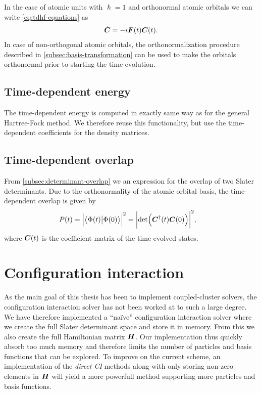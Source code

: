             In the case of atomic units with $\hslash = 1$ and orthonormal
            atomic orbitals we can write \autoref{eq:tdhf-equations} as
            \begin{align}
                \dot{\boldsymbol{C}} = -i\boldsymbol{F}(t)\boldsymbol{C}(t).
                \label{eq:tdhf-orthogonal}
            \end{align}
            In case of non-orthogonal atomic orbitals, the orthonormalization
            procedure described in \autoref{subsec:basis-transformation} can be
            used to make the orbitals orthonormal prior to starting the
            time-evolution.

        \subsection{Time-dependent energy}
            The time-dependent energy is computed in exactly same way as for the
            general Hartree-Fock method.
            We therefore reuse this functionality, but use the time-dependent
            coefficients for the density matrices.

        \subsection{Time-dependent overlap}
            From \autoref{subsec:determinant-overlap} we an expression for the
            overlap of two Slater determinants.
            Due to the orthonormality of the atomic orbital basis, the
            time-dependent overlap is given by
            \begin{align}
                P(t)
                =
                \abs{\braket{\Phi(t)}{\Phi(0)}}^2
                &= \abs{\det(\boldsymbol{C}^{\dagger}(t)\boldsymbol{C}(0))}^{2},
            \end{align}
            where $\boldsymbol{C}(t)$ is the coefficient matrix of the time evolved states.


    \section{Configuration interaction}
        As the main goal of this thesis has been to implement coupled-cluster
        solvers, the configuration interaction solver has not been worked at to
        such a large degree.
        We have therefore implemented a ``naïve'' configuration interaction
        solver where we create the full Slater determinant space and store it in
        memory.
        From this we also create the full Hamiltonian matrix $\boldsymbol{H}$.
        Our implementation thus quickly absorb too much memory and therefore
        limits the number of particles and basis functions that can be explored.
        To improve on the current scheme, an implementation of the \emph{direct
        CI} methods \cite{helgaker-molecular} along with only storing non-zero
        elements in $\boldsymbol{H}$ will yield a more powerfull method supporting
        more particles and basis functions.

